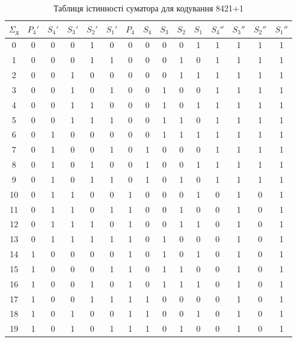 \documentclass[12pt,a4paper]{article}
\begin{document}
    \begin{table}[h!]
        \centering
        \renewcommand{\arraystretch}{1.2}
        \setlength{\tabcolsep}{4pt}
        \begin{tabular}{|c|c c c c c|c c c c c|c c c c|}
        \hline
        \rowcolor{gray!30}
        $\Sigma_{\text{д}}$ & $P_4'$ & $S_4'$ & $S_3'$ & $S_2'$ & $S_1'$ & $P_4$ & $S_4$ & $S_3$ & $S_2$ & $S_1$ & $S_4''$ & $S_3''$ & $S_2''$ & $S_1''$ \\
        \hline
        0  & 0  & 0 & 0 & 1 &  0 &   0 & 0 & 0 & 0 & 1   & 1 & 1 & 1 & 1 \\
        1  & 0  & 0 & 0 & 1 &  1 &   0 & 0 & 0 & 1 & 0   & 1 & 1 & 1 & 1 \\
        2  & 0  & 0 & 1 & 0 &  0 &   0 & 0 & 0 & 1 & 1   & 1 & 1 & 1 & 1 \\
        3  & 0  & 0 & 1 & 0 &  1 &   0 & 0 & 1 & 0 & 0   & 1 & 1 & 1 & 1 \\
        4  & 0  & 0 & 1 & 1 &  0 &   0 & 0 & 1 & 0 & 1   & 1 & 1 & 1 & 1 \\
        5  & 0  & 0 & 1 & 1 &  1 &   0 & 0 & 1 & 1 & 0   & 1 & 1 & 1 & 1 \\
        6  & 0  & 1 & 0 & 0 &  0 &   0 & 0 & 1 & 1 & 1   & 1 & 1 & 1 & 1 \\
        7  & 0  & 1 & 0 & 0 &  1 &   0 & 1 & 0 & 0 & 0   & 1 & 1 & 1 & 1 \\
        8  & 0  & 1 & 0 & 1 &  0 &   0 & 1 & 0 & 0 & 1   & 1 & 1 & 1 & 1 \\
        9  & 0  & 1 & 0 & 1 &  1 &   0 & 1 & 0 & 1 & 0   & 1 & 1 & 1 & 1 \\
        10 & 0  & 1 & 1 & 0 &  0 &   1 & 0 & 0 & 0 & 1   & 0 & 1 & 0 & 1 \\
        11 & 0  & 1 & 1 & 0 &  1 &   1 & 0 & 0 & 1 & 0   & 0 & 1 & 0 & 1 \\
        12 & 0  & 1 & 1 & 1 &  0 &   1 & 0 & 0 & 1 & 1   & 0 & 1 & 0 & 1 \\
        13 & 0  & 1 & 1 & 1 &  1 &   1 & 0 & 1 & 0 & 0   & 0 & 1 & 0 & 1 \\
        14 & 1  & 0 & 0 & 0 &  0 &   1 & 0 & 1 & 0 & 1   & 0 & 1 & 0 & 1 \\
        15 & 1  & 0 & 0 & 0 &  1 &   1 & 0 & 1 & 1 & 0   & 0 & 1 & 0 & 1 \\
        16 & 1  & 0 & 0 & 1 &  0 &   1 & 0 & 1 & 1 & 1   & 0 & 1 & 0 & 1 \\
        17 & 1  & 0 & 0 & 1 &  1 &   1 & 1 & 0 & 0 & 0   & 0 & 1 & 0 & 1 \\
        18 & 1  & 0 & 1 & 0 &  0 &   1 & 1 & 0 & 0 & 1   & 0 & 1 & 0 & 1 \\
        19 & 1  & 0 & 1 & 0 &  1 &   1 & 1 & 0 & 1 & 0   & 0 & 1 & 0 & 1 \\
        \hline
        \end{tabular}
        \caption{Таблиця істинності суматора для кодування 8421+1}
    \end{table}
\end{document}
